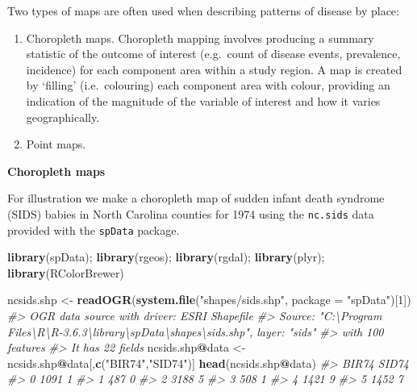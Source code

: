 \documentclass[
]{article}
\newenvironment{Shaded}{\begin{snugshade}}{\end{snugshade}}
\newcommand{\CommentTok}[1]{\textcolor[rgb]{0.56,0.35,0.01}{\textit{#1}}}
\newcommand{\DataTypeTok}[1]{\textcolor[rgb]{0.13,0.29,0.53}{#1}}
\newcommand{\DecValTok}[1]{\textcolor[rgb]{0.00,0.00,0.81}{#1}}
\newcommand{\KeywordTok}[1]{\textcolor[rgb]{0.13,0.29,0.53}{\textbf{#1}}}
\newcommand{\NormalTok}[1]{#1}
\newcommand{\OperatorTok}[1]{\textcolor[rgb]{0.81,0.36,0.00}{\textbf{#1}}}
\newcommand{\StringTok}[1]{\textcolor[rgb]{0.31,0.60,0.02}{#1}}
\begin{document}
Two types of maps are often used when describing patterns of disease by
place:

\begin{enumerate}
\def\labelenumi{\arabic{enumi}.}
\item
  Choropleth maps. Choropleth mapping involves producing a summary
  statistic of the outcome of interest (e.g.~count of disease events,
  prevalence, incidence) for each component area within a study region.
  A map is created by `filling' (i.e.~colouring) each component area
  with colour, providing an indication of the magnitude of the variable
  of interest and how it varies geographically.
\item
  Point maps.
\end{enumerate}

\textbf{Choropleth maps}

For illustration we make a choropleth map of sudden infant death
syndrome (SIDS) babies in North Carolina counties for 1974 using the
\texttt{nc.sids} data provided with the \texttt{spData} package.

\begin{Shaded}
\begin{Highlighting}[]
\KeywordTok{library}\NormalTok{(spData); }\KeywordTok{library}\NormalTok{(rgeos); }\KeywordTok{library}\NormalTok{(rgdal); }\KeywordTok{library}\NormalTok{(plyr); }\KeywordTok{library}\NormalTok{(RColorBrewer)}

\NormalTok{ncsids.shp \textless{}{-}}\StringTok{ }\KeywordTok{readOGR}\NormalTok{(}\KeywordTok{system.file}\NormalTok{(}\StringTok{"shapes/sids.shp"}\NormalTok{, }\DataTypeTok{package =} \StringTok{"spData"}\NormalTok{)[}\DecValTok{1}\NormalTok{])}
\CommentTok{\#\textgreater{} OGR data source with driver: ESRI Shapefile }
\CommentTok{\#\textgreater{} Source: "C:\textbackslash{}Program Files\textbackslash{}R\textbackslash{}R{-}3.6.3\textbackslash{}library\textbackslash{}spData\textbackslash{}shapes\textbackslash{}sids.shp", layer: "sids"}
\CommentTok{\#\textgreater{} with 100 features}
\CommentTok{\#\textgreater{} It has 22 fields}
\NormalTok{ncsids.shp}\OperatorTok{@}\NormalTok{data \textless{}{-}}\StringTok{ }\NormalTok{ncsids.shp}\OperatorTok{@}\NormalTok{data[,}\KeywordTok{c}\NormalTok{(}\StringTok{"BIR74"}\NormalTok{,}\StringTok{"SID74"}\NormalTok{)]}
\KeywordTok{head}\NormalTok{(ncsids.shp}\OperatorTok{@}\NormalTok{data)}
\CommentTok{\#\textgreater{}   BIR74 SID74}
\CommentTok{\#\textgreater{} 0  1091     1}
\CommentTok{\#\textgreater{} 1   487     0}
\CommentTok{\#\textgreater{} 2  3188     5}
\CommentTok{\#\textgreater{} 3   508     1}
\CommentTok{\#\textgreater{} 4  1421     9}
\CommentTok{\#\textgreater{} 5  1452     7}
\end{Highlighting}
\end{Shaded}
\end{document}
